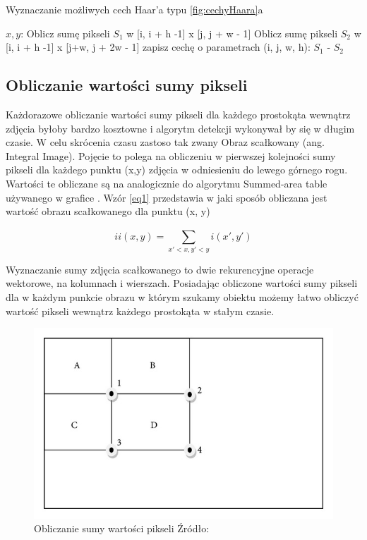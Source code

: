 \begin{algorithm}[H]
\caption{Wyznaczanie możliwych cech Haar'a typu \ref{fig:cechyHaara}a}
\label{alg:sumaPikseli}
\begin{algorithmic} 
\DontPrintSemicolon
\STATE $x, y$: 
\STATE Oblicz sumę pikseli ${S_{1}}$ w [i, i + h -1] x [j, j + w - 1]
\STATE Oblicz sumę pikseli $S_2$ w [i, i + h -1] x [j+w, j + 2w - 1]
\STATE zapisz cechę o parametrach (i, j, w, h): ${S_{1}}$ - ${S_{2}}$
\ENDFOR
\ENDFOR
\ENDFOR
\ENDFOR
\end{algorithmic}
\end{algorithm}

\subsection{Obliczanie wartości sumy pikseli}

Każdorazowe obliczanie wartości sumy pikseli dla każdego prostokąta wewnątrz zdjęcia byłoby bardzo kosztowne i algorytm detekcji wykonywał by się w długim czasie. W celu skrócenia czasu zastoso tak zwany Obraz scałkowany (ang. Integral Image).
Pojęcie to polega na obliczeniu w pierwszej kolejności sumy pikseli dla każdego punktu (x,y) zdjęcia w odniesieniu do lewego górnego rogu. Wartości te obliczane są na analogicznie do  algorytmu Summed-area table używanego w grafice \cite{sumAreaTable}. Wzór \ref{eq1} przedstawia w jaki sposób obliczana jest wartość obrazu scałkowanego dla punktu (x, y)

\begin{equation} \label{eq1}
ii(x,y) = \sum_{x'<x, y'<y}^{} i(x', y')
\end{equation}

Wyznaczanie sumy zdjęcia scałkowanego to dwie rekurencyjne operacje wektorowe, na kolumnach i wierszach.
Posiadając obliczone wartości sumy pikseli dla w każdym punkcie obrazu w którym szukamy obiektu możemy łatwo obliczyć wartość pikseli wewnątrz każdego prostokąta w stałym czasie.

\begin{figure}[H]
\centering
\includegraphics[scale=1.4]{imgs/sumPixels.png}
\caption{Obliczanie sumy wartości pikseli Źródło: \cite{sumPixelsDoc}}
\label{fig:obrazScalkowany}
\end{figure}


